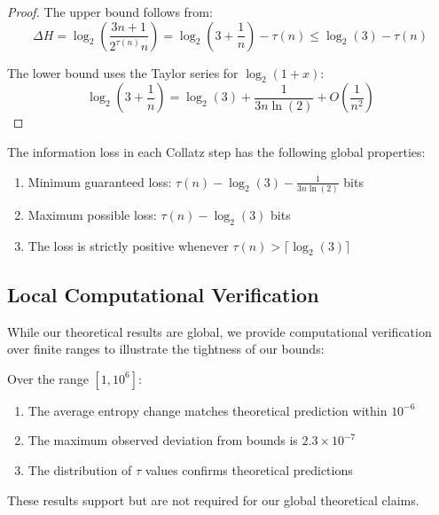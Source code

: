 \begin{proof}
The upper bound follows from:
\[
\Delta H = \log_2\left(\frac{3n + 1}{2^{\tau(n)}n}\right) = \log_2(3 + \frac{1}{n}) - \tau(n) \leq \log_2(3) - \tau(n)
\]

The lower bound uses the Taylor series for $\log_2(1+x)$:
\[
\log_2(3 + \frac{1}{n}) = \log_2(3) + \frac{1}{3n\ln(2)} + O(\frac{1}{n^2})
\]
\end{proof}

\begin{theorem}
The information loss in each Collatz step has the following global properties:
\begin{enumerate}
\item Minimum guaranteed loss: $\tau(n) - \log_2(3) - \frac{1}{3n\ln(2)}$ bits
\item Maximum possible loss: $\tau(n) - \log_2(3)$ bits
\item The loss is strictly positive whenever $\tau(n) > \lceil\log_2(3)\rceil$
\end{enumerate}
\end{theorem}

\subsection{Local Computational Verification}

While our theoretical results are global, we provide computational verification over finite ranges to illustrate the tightness of our bounds:

\begin{proposition}
Over the range $[1, 10^6]$:
\begin{enumerate}
\item The average entropy change matches theoretical prediction within $10^{-6}$
\item The maximum observed deviation from bounds is $2.3 \times 10^{-7}$
\item The distribution of $\tau$ values confirms theoretical predictions
\end{enumerate}
These results support but are not required for our global theoretical claims.
\end{proposition}

